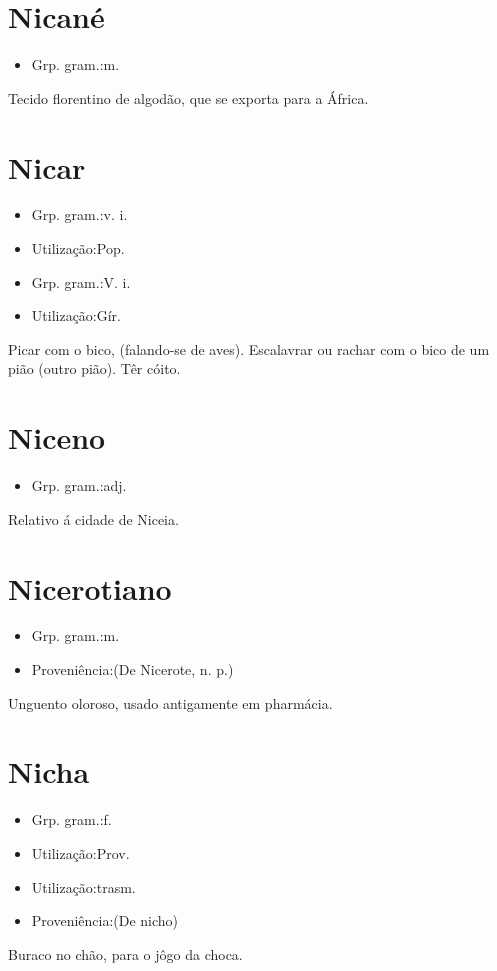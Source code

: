 \section{Nicané}
\begin{itemize}
\item {Grp. gram.:m.}
\end{itemize}
Tecido florentino de algodão, que se exporta para a África.
\section{Nicar}
\begin{itemize}
\item {Grp. gram.:v. i.}
\end{itemize}
\begin{itemize}
\item {Utilização:Pop.}
\end{itemize}
\begin{itemize}
\item {Grp. gram.:V. i.}
\end{itemize}
\begin{itemize}
\item {Utilização:Gír.}
\end{itemize}
Picar com o bico, (falando-se de aves).
Escalavrar ou rachar com o bico de um pião (outro pião).
Têr cóito.
\section{Niceno}
\begin{itemize}
\item {Grp. gram.:adj.}
\end{itemize}
Relativo á cidade de Niceia.
\section{Nicerotiano}
\begin{itemize}
\item {Grp. gram.:m.}
\end{itemize}
\begin{itemize}
\item {Proveniência:(De \textunderscore Nicerote\textunderscore , n. p.)}
\end{itemize}
Unguento oloroso, usado antigamente em pharmácia.
\section{Nicha}
\begin{itemize}
\item {Grp. gram.:f.}
\end{itemize}
\begin{itemize}
\item {Utilização:Prov.}
\end{itemize}
\begin{itemize}
\item {Utilização:trasm.}
\end{itemize}
\begin{itemize}
\item {Proveniência:(De \textunderscore nicho\textunderscore )}
\end{itemize}
Buraco no chão, para o jôgo da choca.
